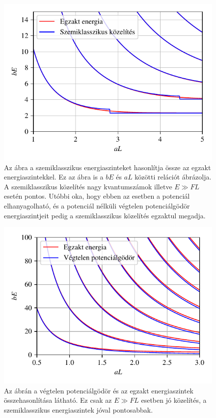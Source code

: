 \begin{figure}[H]
	\centering
	\includegraphics[scale=1]{./figs/energiaszintkozelites.pdf}
	\caption[Szemiklasszikus energiaszintek]{Az ábra a szemiklasszikus energiaszinteket hasonlítja össze az egzakt energiaszintekkel. Ez az ábra is a $bE$ és $aL$ közötti relációt ábrázolja. A szemiklasszikus közelítés nagy kvantumszámok illetve $E \gg FL$ esetén pontos. Utóbbi oka, hogy ebben az esetben a potenciál elhanyagolható, és a potenciál nélküli végtelen potenciálgödör energiaszintjeit pedig a szemiklasszikus közelítés egzaktul megadja.}
	\label{semiclassicallevels:kozelites}
\end{figure}
\begin{figure}[H]
	\centering
	\includegraphics[scale=1]{./figs/infsquareenergia.pdf}
	\caption[Végtelen potenciálgödör energiaszintjei]{Az ábrán a végtelen potenciálgödör és az egzakt energiaszintek összehasonlítása látható. Ez csak az $E \gg FL$ esetben jó közelítés, a szemiklasszikus energiaszintek jóval pontosabbak.}
	\label{semiclassicallevels:squarewell}
\end{figure}